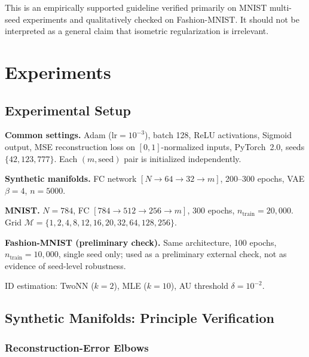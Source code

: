 \documentclass[make,article,submit,pdftex,moreauthors]{Definitions/mdpi}
\begin{document}
This is an empirically supported guideline verified primarily on MNIST
multi-seed experiments and qualitatively checked on Fashion-MNIST.
It should not be interpreted as a general claim that isometric regularization
is irrelevant.

\section{Experiments}\label{sec:exp}

\subsection{Experimental Setup}\label{sec:exp_setup}

\textbf{Common settings.}
Adam ($\mathrm{lr} = 10^{-3}$), batch 128, ReLU activations, Sigmoid output,
MSE reconstruction loss on $[0,1]$-normalized inputs, PyTorch~2.0,
seeds $\{42, 123, 777\}$.
Each $(m, \mathrm{seed})$ pair is initialized independently.

\textbf{Synthetic manifolds.}
FC network $[N \to 64 \to 32 \to m]$, 200--300 epochs, VAE $\beta = 4$,
$n = 5000$.

\textbf{MNIST.}
$N = 784$, FC $[784 \to 512 \to 256 \to m]$, 300 epochs,
$n_{\mathrm{train}} = 20{,}000$.
Grid $\mathcal{M} = \{1, 2, 4, 8, 12, 16, 20, 32, 64, 128, 256\}$.

\textbf{Fashion-MNIST (preliminary check).}
Same architecture, 100 epochs, $n_{\mathrm{train}} = 10{,}000$,
single seed only; used as a preliminary external check, not as evidence
of seed-level robustness.

ID estimation: TwoNN ($k = 2$), MLE ($k = 10$),
AU threshold $\delta = 10^{-2}$.

\subsection{Synthetic Manifolds: Principle Verification}
\label{sec:exp_synthetic}

\subsubsection{Reconstruction-Error Elbows}
\end{document}
